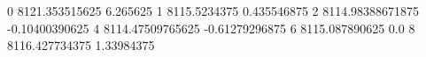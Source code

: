 0 8121.353515625 6.265625
1 8115.5234375 0.435546875
2 8114.98388671875 -0.10400390625
4 8114.47509765625 -0.61279296875
6 8115.087890625 0.0
8 8116.427734375 1.33984375
